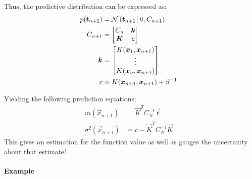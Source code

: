			Thus, the predictive distribution can be expressed as:
			\begin{align}
				p(\bm{t}_{n + 1}) & = \mathcal{N}\,(\bm{t}_{n + 1} \,\vert\, 0, C_{n + 1}) \\
				C_{n + 1}          & =
				\begin{bmatrix}
					C_n     & \bm{k} \\
					\bm{K} & c
				\end{bmatrix}                                                         \\
				\bm{k}            & =
				\begin{bmatrix}
					K(\bm{x}_1, \bm{x}_{n + 1}) \\
					\vdots                        \\
					K(\bm{x}_n, \bm{x}_{n + 1})
				\end{bmatrix}                                             \\
				c                  & = K(\bm{x}_{n + 1}, \bm{x}_{n + 1}) + \beta^{-1}
			\end{align}

			Yielding the following prediction equations:
			\begin{align}
				m(\vec{x}_{n + 1})        & = \vec{K}^T C_N^{-1} \vec{t}     \\
				\sigma^2(\vec{x}_{n + 1}) & = c - \vec{K}^T C_N^{-1} \vec{K}
			\end{align}
			This gives an estimation for the function value as well as gauges the uncertainty about that estimate!

			\paragraph{Example}

